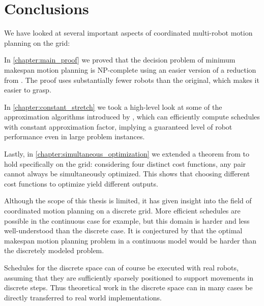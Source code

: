 
\section{Conclusions}

We have looked at several important aspects of coordinated multi-robot motion planning on the grid:

In \cref{chapter:main_proof} we proved that the decision problem of minimum makespan motion planning is NP-complete using an easier version of a reduction from \cite{siamcomp/DemaineFKMS19}.
The proof uses substantially fewer robots than the original, which makes it easier to grasp. 

In \cref{chapter:constant_stretch} we took a high-level look at some of the approximation algorithms introduced by \cite{siamcomp/DemaineFKMS19}, which can efficiently compute schedules with constant approximation factor, implying a guaranteed level of robot performance even in large problem instances.

Lastly, in \cref{chapter:simultaneous_optimization} we extended a theorem from \cite{corr/YuL15c} to hold specifically on the grid: considering four distinct cost functions, any pair cannot always be simultaneously optimized.
This shows that choosing different cost functions to optimize yield different outputs.


Although the scope of this thesis is limited, it has given insight into the field of coordinated motion planning on a discrete grid.
More efficient schedules are possible in the continuous case for example, but this domain is harder and less well-understood than the discrete case.
It is conjectured by \cite{siamcomp/DemaineFKMS19} that the optimal makespan motion planning problem in a continuous model would be harder than the discretely modeled problem. 

Schedules for the discrete space can of course be executed with real robots, assuming that they are sufficiently sparsely positioned to support movements in discrete steps. 
Thus theoretical work in the discrete space can in many cases be directly transferred to real world implementations.

